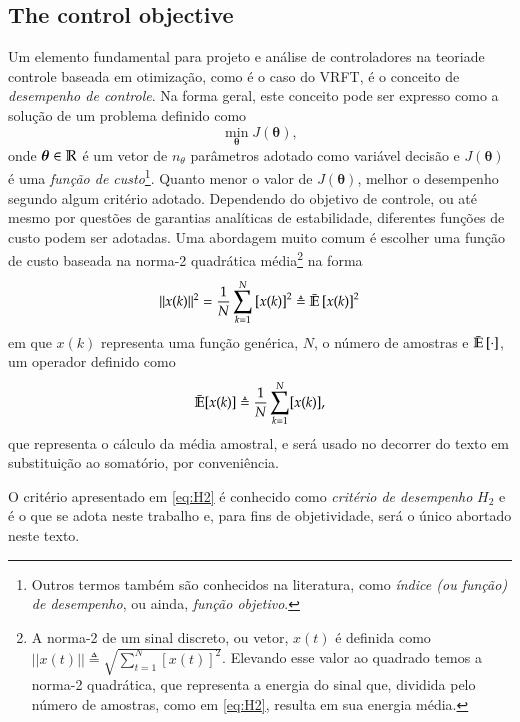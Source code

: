 \subsection{The control objective}%
\label{sub:the_reference_model}

Um elemento fundamental para projeto e análise de controladores na teoriade controle baseada em otimização, como é o caso do VRFT, é o conceito de \textit{desempenho de controle}. Na forma geral, este conceito pode ser expresso como a solução de um problema definido como
\begin{equation}
   \min_{\bm{\theta}} J(\bm{\theta}),
\end{equation}
onde $\bm{\theta} \in \mathbb{R}$ é um vetor de $n_{\theta}$ parâmetros adotado como variável decisão e $J(\bm{\theta})$ é uma \textit{função de custo}\footnote{Outros termos também são conhecidos na literatura, como \textit{índice (ou função) de desempenho}, ou ainda, \textit{função objetivo}.}. Quanto menor o valor de $J(\bm{\theta})$, melhor o desempenho segundo algum critério adotado. Dependendo do objetivo de controle, ou até mesmo por questões de garantias analíticas de estabilidade, diferentes funções de custo podem ser adotadas. Uma abordagem muito comum é escolher uma função de custo baseada na  norma-2 quadrática média\footnote{A norma-2 de um sinal discreto, ou vetor, $x(t)$ é definida como $||x(t)|| \triangleq \sqrt{ \sum_{t=1}^{N} [x(t)]^{2} }$. Elevando esse valor ao quadrado temos a norma-2 quadrática, que representa a energia do sinal que, dividida pelo número de amostras, como em \eqref{eq:H2}, resulta em sua energia média.}
na forma
\begin{equation}
   ||x(k)||^{2} =\frac{1}{N}\sum_{k=1}^{N} \left[ x(k) \right]^{2} \triangleq \bar{\mathbb{E}} \left[ x(k) \right]^{2}
   \label{eq:H2}
\end{equation}
em que $x(k)$ representa uma função genérica, $N$, o número de amostras e $\bar{\mathbb{E}}\left[ \cdot \right] $, um operador definido como
\begin{equation}
   \bar{\mathbb{E}}[x(k)] \triangleq \frac{1}{N}\sum_{k=1}^{N} [x(k)],
\end{equation}
que representa o cálculo da média amostral, e será usado no decorrer do texto em substituição ao somatório, por conveniência.

O critério apresentado em \eqref{eq:H2} é conhecido como \textit{critério de desempenho} $H_2$ e é o que se adota neste trabalho e, para fins de objetividade, será o único abortado neste texto.

